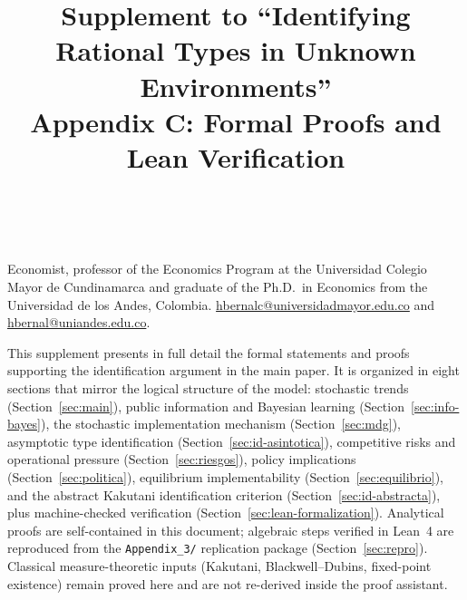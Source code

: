 \documentclass[ecta,nameyear,final,supplement]{econsocart}
\numberwithin{equation}{section}
\numberwithin{table}{section}
\theoremstyle{definition}
\begin{document}
\begin{frontmatter}

\title{Supplement to ``Identifying Rational Types in Unknown Environments''\\
Appendix C: Formal Proofs and Lean Verification}

\begin{aug}
\author[add1,add2]{~}
\address[add1]{%
,
}
\address[add2]{%
,
}
\end{aug}

\begin{funding}
Economist, professor of the Economics Program at the Universidad Colegio
Mayor de Cundinamarca and graduate of the Ph.D.\ in Economics from the
Universidad de los Andes, Colombia.
\href{mailto:hbernalc@universidadmayor.edu.co}{hbernalc@universidadmayor.edu.co}
and \href{mailto:hbernal@uniandes.edu.co}{hbernal@uniandes.edu.co}.
\end{funding}

\end{frontmatter}

\noindent
This supplement presents in full detail the formal statements and proofs
supporting the identification argument in the main paper. It is organized in
eight sections that mirror the logical structure of the model: stochastic
trends (Section~\ref{sec:main}), public information and Bayesian learning
(Section~\ref{sec:info-bayes}), the stochastic implementation mechanism
(Section~\ref{sec:mdg}), asymptotic type identification
(Section~\ref{sec:id-asintotica}), competitive risks and operational pressure
(Section~\ref{sec:riesgos}), policy implications (Section~\ref{sec:politica}),
equilibrium implementability (Section~\ref{sec:equilibrio}), and the abstract
Kakutani identification criterion (Section~\ref{sec:id-abstracta}), plus
machine-checked verification (Section~\ref{sec:lean-formalization}). Analytical
proofs are self-contained in this document; algebraic steps verified in Lean~4
are reproduced from the \texttt{Appendix\_3/} replication package
(Section~\ref{sec:repro}). Classical measure-theoretic inputs (Kakutani,
Blackwell--Dubins, fixed-point existence) remain proved here and are not
re-derived inside the proof assistant.

\end{document}
